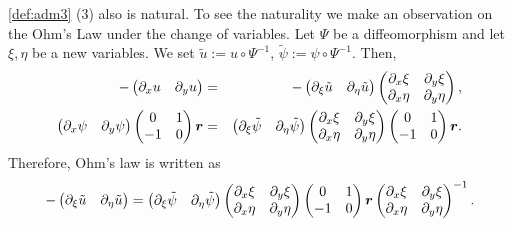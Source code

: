 \documentclass[11pt]{amsart}
\theoremstyle{plain}
\theoremstyle{remark}
\numberwithin{equation}{section}
\numberwithin{Thm}{section}
\def\r{{\bf r}}
\def\r{\mbox{\boldmath$r$}}
\begin{document}
\ref{def:adm3} (3) also is natural. To see the naturality we make an observation on the Ohm's Law under the change of variables.  Let $\Psi$ be a diffeomorphism and let $\xi,\eta$ be a new variables. We set $\tilde{u}:=u\circ\Psi^{-1}$, $\tilde\psi:=\psi\circ\Psi^{-1}$. Then,
\begin{eqnarray*}
  -\begin{pmatrix} \partial_x u & \partial_y u \end{pmatrix} &=&-\begin{pmatrix} \partial_\xi \tilde u & \partial_\eta \tilde u \end{pmatrix} \begin{pmatrix} \partial_x\xi & \partial_y\xi \\ \partial_x\eta & \partial_y\eta\end{pmatrix},\\
  \begin{pmatrix} \partial_x \psi &  \partial_y \psi \end{pmatrix}
  \begin{pmatrix} 0 & 1 \\ -1 & 0 \end{pmatrix}\r
  &=&\begin{pmatrix} \partial_\xi \tilde \psi &  \partial_\eta \tilde \psi \end{pmatrix}
  \begin{pmatrix} \partial_x\xi & \partial_y\xi \\ \partial_x\eta & \partial_y\eta\end{pmatrix}
  \begin{pmatrix} 0 & 1 \\ -1 & 0 \end{pmatrix}\r.
\end{eqnarray*}
Therefore, Ohm's law is written as
$$
  -\begin{pmatrix} \partial_\xi \tilde u & \partial_\eta \tilde u \end{pmatrix}=\begin{pmatrix} \partial_\xi \tilde \psi &  \partial_\eta \tilde \psi \end{pmatrix}
  \begin{pmatrix} \partial_x\xi & \partial_y\xi \\ \partial_x\eta & \partial_y\eta\end{pmatrix}
  \begin{pmatrix} 0 & 1 \\ -1 & 0 \end{pmatrix}\r
  \begin{pmatrix} \partial_x\xi & \partial_y\xi \\ \partial_x\eta & \partial_y\eta\end{pmatrix}^{-1}.
$$
\end{document}
